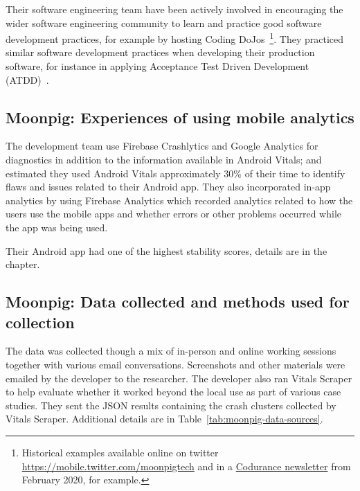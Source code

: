 Their software engineering team have been actively involved in encouraging the wider software engineering community to learn and practice good software development practices, for example by hosting Coding DoJos~\footnote{Historical examples available online on twitter \url{https://mobile.twitter.com/moonpigtech} and in a \href{https://www.codurance.com/publications/newsletters/2020-02-13-newsletter}{Codurance newsletter} from February 2020, for example.}. They practiced similar software development practices when developing their production software, for instance in applying Acceptance Test Driven Development (ATDD)~.

\subsection{Moonpig: Experiences of using mobile analytics}
The development team use Firebase Crashlytics and Google Analytics for diagnostics in addition to the information available in Android Vitals; and estimated they used Android Vitals approximately 30\% of their time to identify flaws and issues related to their Android app.
%
They also incorporated in-app analytics by using Firebase Analytics which recorded analytics related to how the users use the mobile apps and whether errors or other problems occurred while the app was being used. 

Their Android app had one of the highest stability scores, details are in the  chapter.

\subsection{Moonpig: Data collected and methods used for collection}
The data was collected though a mix of in-person and online working sessions together with various email conversations. Screenshots and other materials were emailed by the developer to the researcher. 
%
The developer also ran Vitals Scraper to help evaluate whether it worked beyond the local use as part of various case studies. They sent the JSON results containing the crash clusters collected by Vitals Scraper. Additional details are in Table~\ref{tab:moonpig-data-sources}.

